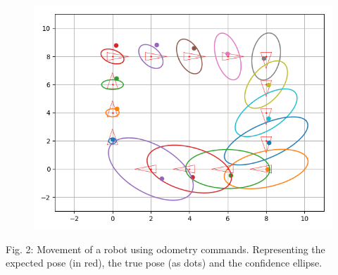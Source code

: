 \documentclass[11pt]{article}
\begin{document}
\begin{figure}
\centering
\includegraphics{images/fig3-3-1.PNG}
\end{figure}
Fig. 2: Movement of a robot using odometry commands. Representing the
expected pose (in red), the true pose (as dots) and the confidence
ellipse.
\end{document}
